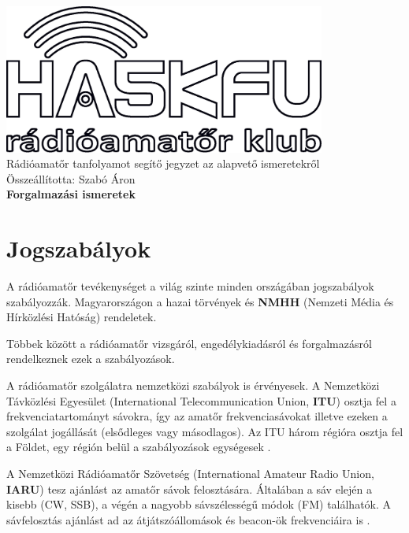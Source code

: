 \documentclass[12pt,a4paper]{article}
\begin{document}
\begin{center}
\includegraphics[width=300pt,keepaspectratio]{figures/ha5kfu.eps}
\\[0.5cm]
Rádióamatőr tanfolyamot segítő jegyzet az alapvető ismeretekről \\
Összeállította: Szabó Áron %
\\[1cm]

{\huge \bfseries Forgalmazási ismeretek \\[2cm]}



\end{center}

\renewcommand{\contentsname}{Tartalom}\tableofcontents 
\newpage
\section{Jogszabályok}

A rádióamatőr tevékenységet a világ szinte minden országában jogszabályok szabályozzák. Magyarországon a hazai törvények és  \textbf{NMHH} (Nemzeti Média és Hírközlési Hatóság) rendeletek.

Többek között a rádióamatőr vizsgáról, engedélykiadásról és forgalmazásról rendelkeznek ezek a szabályozások.  

A rádióamatőr szolgálatra nemzetközi szabályok is érvényesek. A Nemzetközi Távközlési Egyesület (International Telecommunication Union,  \textbf{ITU}) osztja fel a frekvenciatartományt sávokra, így az amatőr frekvenciasávokat illetve ezeken a szolgálat jogállását (elsődleges vagy másodlagos). Az ITU három régióra osztja fel a Földet, egy régión belül a szabályozások egységesek \cite{iaru_regi}.

A Nemzetközi Rádióamatőr Szövetség (International Amateur Radio Union, \textbf{IARU}) tesz ajánlást az amatőr sávok felosztására. Általában a sáv elején a kisebb (CW, SSB), a végén a nagyobb sávszélességű módok (FM) találhatók. A sávfelosztás ajánlást ad az átjátszóállomások és beacon-ök frekvenciáira is \cite{iaru}. 
\end{document}
